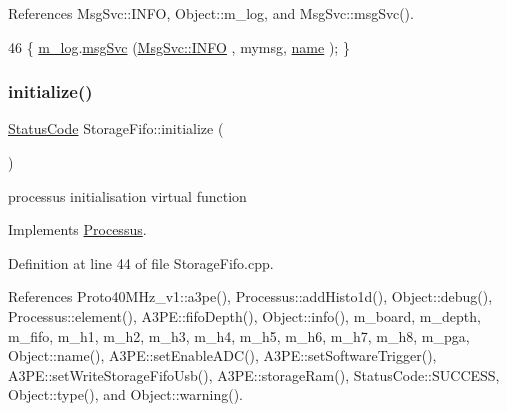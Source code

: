 References Msg\+Svc\+::\+I\+N\+FO, Object\+::m\+\_\+log, and Msg\+Svc\+::msg\+Svc().


\begin{DoxyCode}
46 \{ \hyperlink{classObject_a0d269813dd7ac1f24bc143031e2963f2}{m\_log}.\hyperlink{classMsgSvc_ad25f18047920cc59a314e5098259711c}{msgSvc} (\hyperlink{classMsgSvc_ae671eb7301996cd049d2da8a65925926ad2fcf3f3e734fc41ee097cc23670ce51}{MsgSvc::INFO}    , mymsg, \hyperlink{classObject_a300f4c05dd468c7bb8b3c968868443c1}{name} ); \}
\end{DoxyCode}
\mbox{\label{classStorageFifo_a568becd5cb8d0cb5307a39e0d27fb332}} 
\subsubsection{\texorpdfstring{initialize()}{initialize()}}
{\footnotesize\ttfamily \hyperlink{classStatusCode}{Status\+Code} Storage\+Fifo\+::initialize (\begin{DoxyParamCaption}{ }\end{DoxyParamCaption})\hspace{0.3cm}{\ttfamily [virtual]}}

processus initialisation virtual function 

Implements \hyperlink{classProcessus_aee88ad7b77ae7319cf8b128e9dd2ea11}{Processus}.



Definition at line 44 of file Storage\+Fifo.\+cpp.



References Proto40\+M\+Hz\+\_\+v1\+::a3pe(), Processus\+::add\+Histo1d(), Object\+::debug(), Processus\+::element(), A3\+P\+E\+::fifo\+Depth(), Object\+::info(), m\+\_\+board, m\+\_\+depth, m\+\_\+fifo, m\+\_\+h1, m\+\_\+h2, m\+\_\+h3, m\+\_\+h4, m\+\_\+h5, m\+\_\+h6, m\+\_\+h7, m\+\_\+h8, m\+\_\+pga, Object\+::name(), A3\+P\+E\+::set\+Enable\+A\+D\+C(), A3\+P\+E\+::set\+Software\+Trigger(), A3\+P\+E\+::set\+Write\+Storage\+Fifo\+Usb(), A3\+P\+E\+::storage\+Ram(), Status\+Code\+::\+S\+U\+C\+C\+E\+SS, Object\+::type(), and Object\+::warning().


